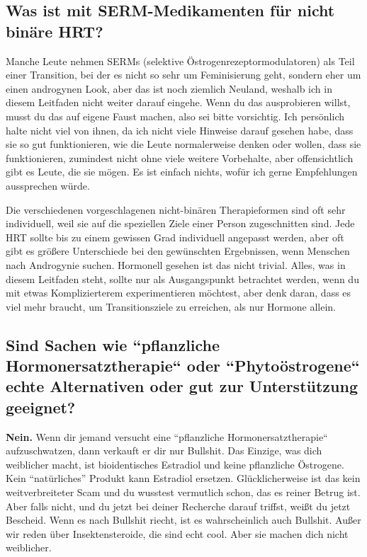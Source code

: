 \documentclass{article}
\begin{document}
\subsection{Was ist mit SERM-Medikamenten für nicht binäre HRT?}

Manche Leute nehmen SERMs (selektive Östrogenrezeptormodulatoren) als Teil einer Transition, bei der es nicht so sehr um Feminisierung geht, sondern eher um einen androgynen Look, aber das ist noch ziemlich Neuland, weshalb ich in diesem Leitfaden nicht weiter darauf eingehe. Wenn du das ausprobieren willst, musst du das auf eigene Faust machen, also sei bitte vorsichtig. Ich persönlich halte nicht viel von ihnen, da ich nicht viele Hinweise darauf gesehen habe, dass sie so gut funktionieren, wie die Leute normalerweise denken oder wollen, dass sie funktionieren, zumindest nicht ohne viele weitere Vorbehalte, aber offensichtlich gibt es Leute, die sie mögen. Es ist einfach nichts, wofür ich gerne Empfehlungen aussprechen würde.

Die verschiedenen vorgeschlagenen nicht-binären Therapieformen sind oft sehr individuell, weil sie auf die speziellen Ziele einer Person zugeschnitten sind. Jede HRT sollte bis zu einem gewissen Grad individuell angepasst werden, aber oft gibt es größere Unterschiede bei den gewünschten Ergebnissen, wenn Menschen nach Androgynie suchen. Hormonell gesehen ist das nicht trivial. Alles, was in diesem Leitfaden steht, sollte nur als Ausgangspunkt betrachtet werden, wenn du mit etwas Komplizierterem experimentieren möchtest, aber denk daran, dass es viel mehr braucht, um Transitionsziele zu erreichen, als nur Hormone allein.

\subsection{Sind Sachen wie “pflanzliche Hormonersatztherapie“ oder “Phytoöstrogene“ echte Alternativen oder gut zur Unterstützung geeignet?}

\textbf{Nein.} Wenn dir jemand versucht eine “pflanzliche Hormonersatztherapie“ aufzuschwatzen, dann verkauft er dir nur Bullshit. Das Einzige, was dich weiblicher macht, ist bioidentisches Estradiol und keine pflanzliche Östrogene. Kein “natürliches” Produkt kann Estradiol ersetzen. Glücklicherweise ist das kein weitverbreiteter Scam und du wusstest vermutlich schon, das es reiner Betrug ist. Aber falls nicht, und du jetzt bei deiner Recherche darauf triffst, weißt du jetzt Bescheid. Wenn es nach Bullshit riecht, ist es wahrscheinlich auch Bullshit. Außer wir reden über Insektensteroide, die sind echt cool. Aber sie machen dich nicht weiblicher.
\end{document}
